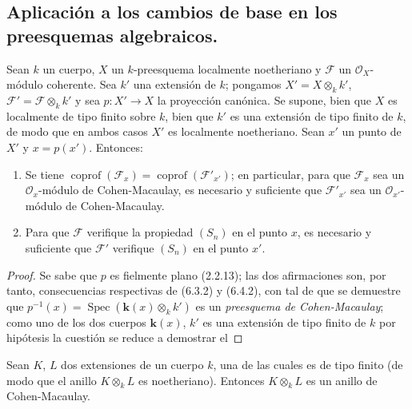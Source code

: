 \subsection{Aplicación a los cambios de base en los preesquemas algebraicos.}

\begin{proposition}[6.7.1]
\label{IV.2.s6.7.1-fr}
Sean $k$ un cuerpo, $X$ un $k$-preesquema localmente noetheriano y
$\mathscr F$ un $\mathcal O_X$-módulo coherente. Sea $k'$ una extensión
de $k$; pongamos $X'=X\otimes_k k'$, $\mathscr F'=\mathscr F\otimes_k k'$
y sea $p:X'\to X$ la proyección canónica. Se supone, bien que
$X$ es localmente de tipo finito sobre $k$, bien que $k'$ es una extensión
de tipo finito de $k$, de modo que en ambos casos $X'$ es localmente
noetheriano. Sean $x'$ un punto de $X'$ y $x=p(x')$. Entonces:
\begin{enumerate}
\item[\textup{(i)}] Se tiene $\operatorname{coprof}(\mathscr F_x)=
\operatorname{coprof}(\mathscr F'_{x'})$; en particular, para que
$\mathscr F_x$ sea un $\mathcal O_x$-módulo de Cohen-Macaulay, es
necesario y suficiente que $\mathscr F'_{x'}$ sea un
$\mathcal O_{x'}$-módulo de Cohen-Macaulay.
\item[\textup{(ii)}] Para que $\mathscr F$ verifique la propiedad $(S_n)$ en el punto
$x$, es necesario y suficiente que $\mathscr F'$ verifique $(S_n)$ en el
punto $x'$.
\end{enumerate}
\end{proposition}


\begin{proof}
Se sabe que $p$ es fielmente plano (2.2.13); las dos afirmaciones son, por
tanto, consecuencias respectivas de (6.3.2) y (6.4.2), con tal de que se
demuestre que $p^{-1}(x)=\operatorname{Spec}(\boldsymbol{k}(x)\otimes_k k')$ es un
\emph{preesquema de Cohen-Macaulay}; como uno de los dos cuerpos $\boldsymbol{k}(x)$, $k'$ es
una extensión de tipo finito de $k$ por hipótesis la cuestión se reduce a demostrar
el
\end{proof}

\begin{lemma}[6.7.1.1]
\label{IV.2.s6.7.1.1-fr}
Sean $K$, $L$ dos extensiones de un cuerpo $k$, una de las cuales es de tipo
finito (de modo que el anillo $K\otimes_k L$ es noetheriano). Entonces
$K\otimes_k L$ es un anillo de Cohen-Macaulay.
\end{lemma}

